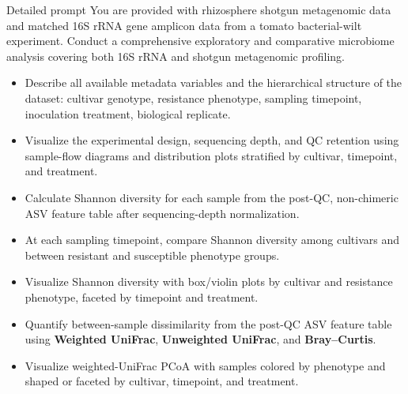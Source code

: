 \renewenvironment{promptitems}{%
  \begin{itemize}%
  \setlength{\itemsep}{0pt}%
  \setlength{\parsep}{0pt}%
  \setlength{\topsep}{0.15em}%
  \setlength{\leftmargin}{1.2em}%
}{\end{itemize}}
\begin{promptbox}{Detailed prompt}
You are provided with rhizosphere shotgun metagenomic data and matched 16S rRNA
gene amplicon data from a tomato bacterial-wilt experiment. Conduct a
comprehensive exploratory and comparative microbiome analysis covering both 16S
rRNA and shotgun metagenomic profiling.
\begin{promptitems}
\item Describe all available metadata variables and the hierarchical structure
  of the dataset: cultivar genotype, resistance phenotype, sampling timepoint,
  inoculation treatment, biological replicate.
\item Visualize the experimental design, sequencing depth, and QC retention
  using sample-flow diagrams and distribution plots stratified by cultivar,
  timepoint, and treatment.
\end{promptitems}
\begin{promptitems}
\item Calculate Shannon diversity for each sample from the post-QC, non-chimeric
  ASV feature table after sequencing-depth normalization.
\item At each sampling timepoint, compare Shannon diversity among cultivars and
  between resistant and susceptible phenotype groups.
\item Visualize Shannon diversity with box/violin plots by cultivar and
  resistance phenotype, faceted by timepoint and treatment.
\end{promptitems}
\begin{promptitems}
\item Quantify between-sample dissimilarity from the post-QC ASV feature table
  using \textbf{Weighted UniFrac}, \textbf{Unweighted UniFrac}, and
  \textbf{Bray--Curtis}.
\item Visualize weighted-UniFrac PCoA with samples colored by phenotype and
  shaped or faceted by cultivar, timepoint, and treatment.

\end{promptitems}
\end{promptbox}
